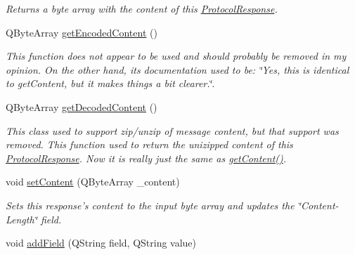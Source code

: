 \begin{DoxyCompactItemize}
\begin{DoxyCompactList}\small\item\em Returns a byte array with the content of this \hyperlink{struct_picto_1_1_protocol_response}{Protocol\-Response}. \end{DoxyCompactList}\item 
\hypertarget{struct_picto_1_1_protocol_response_a68053b6ce1feb22f3f78033428537eb6}{Q\-Byte\-Array \hyperlink{struct_picto_1_1_protocol_response_a68053b6ce1feb22f3f78033428537eb6}{get\-Encoded\-Content} ()}\label{struct_picto_1_1_protocol_response_a68053b6ce1feb22f3f78033428537eb6}

\begin{DoxyCompactList}\small\item\em This function does not appear to be used and should probably be removed in my opinion. On the other hand, its documentation used to be\-: \char`\"{}\-Yes, this is identical to get\-Content, but it makes things a bit clearer.\char`\"{}. \end{DoxyCompactList}\item 
\hypertarget{struct_picto_1_1_protocol_response_a3c1ec9136c91f050ee4498ee7f7d3841}{Q\-Byte\-Array \hyperlink{struct_picto_1_1_protocol_response_a3c1ec9136c91f050ee4498ee7f7d3841}{get\-Decoded\-Content} ()}\label{struct_picto_1_1_protocol_response_a3c1ec9136c91f050ee4498ee7f7d3841}

\begin{DoxyCompactList}\small\item\em This class used to support zip/unzip of message content, but that support was removed. This function used to return the unizipped content of this \hyperlink{struct_picto_1_1_protocol_response}{Protocol\-Response}. Now it is really just the same as \hyperlink{struct_picto_1_1_protocol_response_a2fab73b8683ab2ca637bcf2d2927e6d7}{get\-Content()}. \end{DoxyCompactList}\item 
void \hyperlink{struct_picto_1_1_protocol_response_a59aba20feeebb72e03682f06ccad5f39}{set\-Content} (Q\-Byte\-Array \-\_\-content)
\begin{DoxyCompactList}\small\item\em Sets this response's content to the input byte array and updates the \char`\"{}\-Content-\/\-Length\char`\"{} field. \end{DoxyCompactList}\item 
\hypertarget{struct_picto_1_1_protocol_response_a9fa9c893189686ea4da560db89efaca9}{void \hyperlink{struct_picto_1_1_protocol_response_a9fa9c893189686ea4da560db89efaca9}{add\-Field} (Q\-String field, Q\-String value)}\label{struct_picto_1_1_protocol_response_a9fa9c893189686ea4da560db89efaca9}


\end{DoxyCompactItemize}
